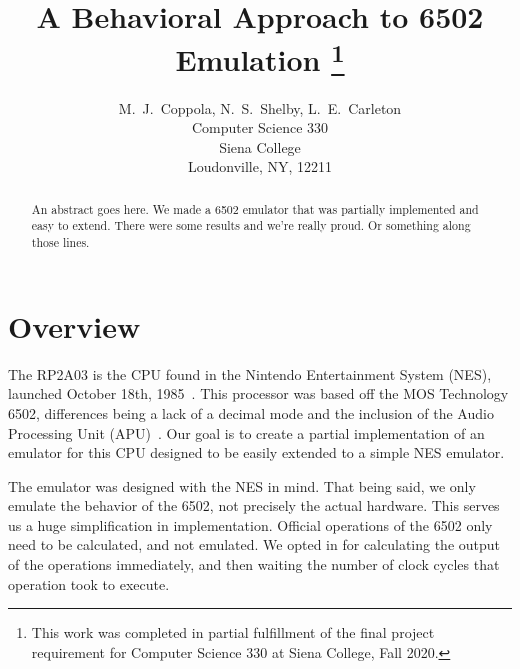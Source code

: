 \documentclass[12pt]{article}
\newcommand{\doublespace}{
  \protect\renewcommand\baselinestretch{1.5}
  \protect\normalsize
}
\begin{document}
\date{}

\title{A Behavioral Approach to 6502 Emulation
\footnote{This work was completed in partial fulfillment of the final
project requirement for Computer Science 330 at Siena College, Fall 2020.}}

\author{M.~J.~Coppola, N.~S.~Shelby, L.~E.~Carleton\\
Computer Science 330\\
Siena College\\
Loudonville, NY, 12211
}

\maketitle
\thispagestyle{empty}

\begin{abstract}
An abstract goes here. We made a 6502 emulator that was partially implemented and easy to extend.
There were some results and we're really proud. Or something along those lines.
\end{abstract}

\doublespace
\section{Overview}
\label{sec:overview}
The RP2A03 is the CPU found in the Nintendo Entertainment System (NES), launched October 18th, 1985~\cite{nesdev_CPU, wikipediaNES}.
This processor was based off the MOS Technology 6502, differences being a lack of a decimal mode
and the inclusion of the Audio Processing Unit (APU)~\cite{nesdev_CPU}. Our goal is to create a partial implementation
of an emulator for this CPU designed to be easily extended to a simple NES emulator. 

The emulator was designed with the NES in mind. That being said, we only emulate the behavior of
the 6502, not precisely the actual hardware. This serves us a huge simplification in implementation.
Official operations of the 6502 only need to be calculated, and not emulated. We opted in for calculating
the output of the operations immediately, and then waiting the number of clock cycles that operation
took to execute.
\end{document}
